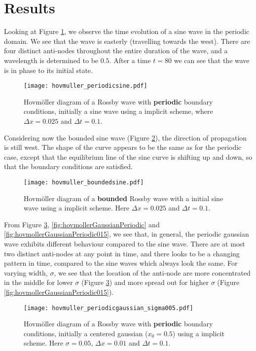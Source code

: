 \section{Results}
\label{sec:results}

Looking at Figure \ref{fig:hovmollerSinePeriodic}, we observe the time evolution of a sine wave in the periodic domain. We see that the wave is easterly (travelling towards the west). There are four distinct anti-nodes throughout the entire duration of the wave, and a wavelength is determined to be $0.5$. After a time $t=80$ we can see that the wave is in phase to its initial state.
\begin{figure}[htbp]
	\centering
	\texttt{[image: hovmuller\_periodicsine.pdf]}
	\caption{Hovmöller diagram of a Rossby wave with \textbf{periodic} boundary conditions, initially a sine wave using a implicit scheme, where $\Delta x = 0.025$ and $\Delta t = 0.1$.}
	\label{fig:hovmollerSinePeriodic}
\end{figure}

Considering now the bounded sine wave (Figure \ref{fig:hovmollerSineBounded}), the direction of propagation is still west. The shape of the curve appears to be the same as for the periodic case, except that the equilibrium line of the sine curve is shifting up and down, so that the boundary conditions are satisfied.
\begin{figure}[htbp]
	\centering
	\texttt{[image: hovmuller\_boundedsine.pdf]}
	\caption{Hovmöller diagram of a \textbf{bounded} Rossby wave with a initial sine wave using a implicit scheme. Here $\Delta x = 0.025$ and $\Delta t = 0.1$.}
	\label{fig:hovmollerSineBounded}
\end{figure}

From Figure \ref{fig:hovmollerGaussianPeriodic005}, \ref{fig:hovmollerGaussianPeriodic} and \ref{fig:hovmollerGaussianPeriodic015}, we see that, in general, the periodic gaussian wave exhibits different behaviour compared to the sine wave. There are at most two distinct anti-nodes at any point in time, and there looks to be a changing pattern in time, compared to the sine waves which always look the same. For varying width, $\sigma$, we see that the location of the anti-node are more concentrated in the middle for lower $\sigma$ (Figure \ref{fig:hovmollerGaussianPeriodic005}) and more spread out for higher $\sigma$ (Figure \ref{fig:hovmollerGaussianPeriodic015}).
\begin{figure}[htbp]
	\centering
	\texttt{[image: hovmuller\_periodicgaussian\_sigma005.pdf]}
	\caption{Hovmöller diagram of a Rossby wave with \textbf{periodic} boundary conditions, initially a centered gaussian ($x_0=0.5$) using a implicit scheme. Here $\sigma = 0.05$, $\Delta x = 0.01$ and $\Delta t = 0.1$.}
	\label{fig:hovmollerGaussianPeriodic005}
\end{figure}

